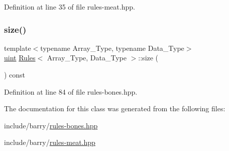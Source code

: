 Definition at line 35 of file rules-\/meat.\+hpp.

\mbox{\label{class_rules_a2f230f733e9936443af660bc890610ef}} 
\subsubsection{\texorpdfstring{size()}{size()}}
{\footnotesize\ttfamily template$<$typename Array\+\_\+\+Type, typename Data\+\_\+\+Type$>$ \\
\hyperlink{typedefs_8hpp_a91ad9478d81a7aaf2593e8d9c3d06a14}{uint} \hyperlink{class_rules}{Rules}$<$ Array\+\_\+\+Type, Data\+\_\+\+Type $>$\+::size (\begin{DoxyParamCaption}{ }\end{DoxyParamCaption}) const\hspace{0.3cm}{\ttfamily [inline]}}



Definition at line 84 of file rules-\/bones.\+hpp.



The documentation for this class was generated from the following files\+:\begin{DoxyCompactItemize}
\item 
include/barry/\hyperlink{rules-bones_8hpp}{rules-\/bones.\+hpp}\item 
include/barry/\hyperlink{rules-meat_8hpp}{rules-\/meat.\+hpp}\end{DoxyCompactItemize}
